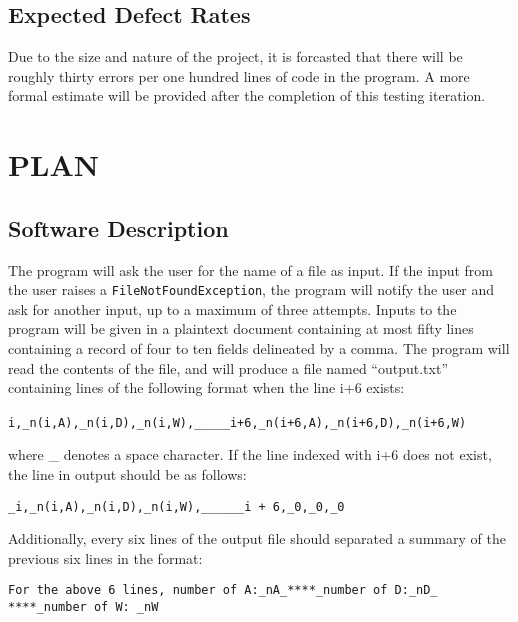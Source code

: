 \documentclass[]{article}
\begin{document}
\subsection{Expected Defect Rates}
\label{sub:references}
Due to the size and nature of the project, it is forcasted that there will be
roughly thirty errors per one hundred lines of code in the program.  A more
formal estimate will be provided after the completion of this testing iteration.



\section{PLAN}
\label{sec:overall_description}

\subsection{Software Description}
\label{sub:product_perspective}
	The program will ask the user for the name of a file as input.  If the input
	from the user raises  a \verb!FileNotFoundException!, the program will notify
	the user and ask for another input, up to a maximum of three attempts. Inputs to the
	program will be given in a plaintext document containing at most fifty lines containing a record of four to ten fields delineated by a comma.
	The program will read the contents of the file, and will produce a file named
	``output.txt'' containing lines of the following format when the line i+6
	exists:
	\begin{center}
	\verb!i,_n(i,A),_n(i,D),_n(i,W),_____i+6,_n(i+6,A),_n(i+6,D),_n(i+6,W)!\
	\end{center}
	where \_ denotes a space character.  If the line indexed with i+6 does not
	exist, the line in output should be as follows:
	\begin{center}
	\verb!_i,_n(i,A),_n(i,D),_n(i,W),______i + 6,_0,_0,_0!
	\end{center}
	Additionally, every six lines of the output file should separated a summary of
	the previous six lines in the format:
	\begin{center}
	\verb!For the above 6 lines, number of A:_nA_****_number of D:_nD_!
	\verb!****_number of W: _nW!
	\end{center}
\end{document}
